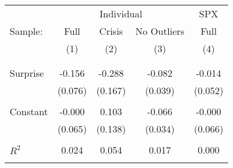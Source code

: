 \small\begin{tabular}{lcccc}
\toprule 
  & \multicolumn{3}{c}{Individual} & SPX \\ 
\cline{2-5} 
 Sample: & Full & Crisis & No Outliers & Full \\ 
  & (1) & (2) & (3) & (4) \\ \\[-1.8ex] 
\hline \\[-1.8ex] 
Surprise & -0.156   & -0.288   & -0.082 & -0.014  \\ 
           & (0.076) & (0.167) & (0.039) & (0.052)  \\ \\[-1.8ex] 
Constant & -0.000  & 0.103 & -0.066 & -0.000  \\ 
           & (0.065) & (0.138) & (0.034) & (0.066)  \\ \\[-1.8ex] 
$R^2$      & 0.024  & 0.054 & 0.017 & 0.000  \\ \\[-1.8ex] 
\bottomrule 
\end{tabular}